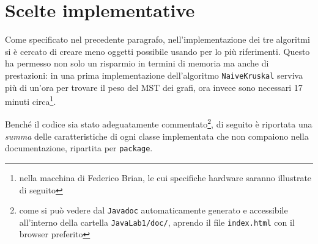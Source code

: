 \section{Scelte implementative}
Come specificato nel precedente paragrafo, nell'implementazione dei tre algoritmi si è cercato di creare meno oggetti possibile usando per lo più riferimenti. Questo ha permesso non solo un risparmio in termini di memoria ma anche di prestazioni: in una prima implementazione dell'algoritmo \texttt{NaiveKruskal} serviva più di un'ora per trovare il peso del MST dei grafi, ora invece sono necessari  17 minuti circa\footnote{nella macchina di Federico Brian, le cui specifiche hardware saranno illustrate di seguito}.\eqcapo

Benché il codice sia stato adeguatamente commentato\footnote{come si può vedere dal \texttt{Javadoc} automaticamente generato e accessibile all'interno della cartella \texttt{JavaLab1/doc/}, aprendo il file \texttt{index.html} con il browser preferito}, di seguito è riportata una \emph{summa} delle caratteristiche di ogni classe implementata che non compaiono nella documentazione, ripartita per \texttt{package}.

